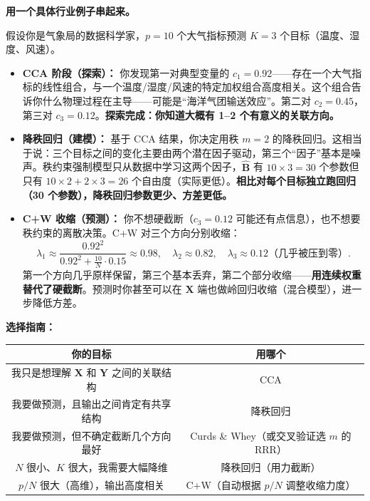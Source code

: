 \medskip
\noindent
\textbf{用一个具体行业例子串起来。}

假设你是气象局的数据科学家，$p=10$ 个大气指标预测 $K=3$ 个目标（温度、湿度、风速）。

\begin{itemize}
    \item \textbf{CCA 阶段（探索）：} 你发现第一对典型变量的 $c_1=0.92$——存在一个大气指标的线性组合，与一个温度/湿度/风速的特定加权组合高度相关。这个组合告诉你什么物理过程在主导——可能是``海洋气团输送效应''。第二对 $c_2=0.45$，第三对 $c_3=0.12$。\textbf{探索完成：你知道大概有 1--2 个有意义的关联方向。}

    \item \textbf{降秩回归（建模）：} 基于 CCA 结果，你决定用秩 $m=2$ 的降秩回归。这相当于说：三个目标之间的变化主要由两个潜在因子驱动，第三个``因子''基本是噪声。秩约束强制模型只从数据中学习这两个因子，$\hat{\mathbf{B}}$ 有 $10 \times 3 = 30$ 个参数但只有 $10 \times 2 + 2 \times 3 = 26$ 个自由度（实际更低）。\textbf{相比对每个目标独立跑回归（30 个参数），降秩回归参数更少、方差更低。}

    \item \textbf{C+W 收缩（预测）：} 你不想硬截断（$c_3=0.12$ 可能还有点信息），也不想要秩约束的离散决策。C+W 对三个方向分别收缩：
    \[
        \lambda_1 \approx \frac{0.92^2}{0.92^2 + \frac{10}{N}\cdot 0.15} \approx 0.98,\quad
        \lambda_2 \approx 0.82,\quad
        \lambda_3 \approx 0.12 \text{（几乎被压到零）}.
    \]
    第一个方向几乎原样保留，第三个基本丢弃，第二个部分收缩——\textbf{用连续权重替代了硬截断}。预测时你甚至可以在 $\mathbf{X}$ 端也做岭回归收缩（混合模型），进一步降低方差。
\end{itemize}

\medskip
\noindent
\textbf{选择指南：}

\begin{center}
\begin{tabular}{c|c}
\toprule
\textbf{你的目标} & \textbf{用哪个} \\
\midrule
我只是想理解 $\mathbf{X}$ 和 $\mathbf{Y}$ 之间的关联结构 & CCA \\
我要做预测，且输出之间肯定有共享结构 & 降秩回归 \\
我要做预测，但不确定截断几个方向最好 & Curds \& Whey（或交叉验证选 $m$ 的 RRR） \\
$N$ 很小、$K$ 很大，我需要大幅降维 & 降秩回归（用力截断） \\
$p/N$ 很大（高维），输出高度相关 & C+W（自动根据 $p/N$ 调整收缩力度） \\
\bottomrule
\end{tabular}
\end{center}

